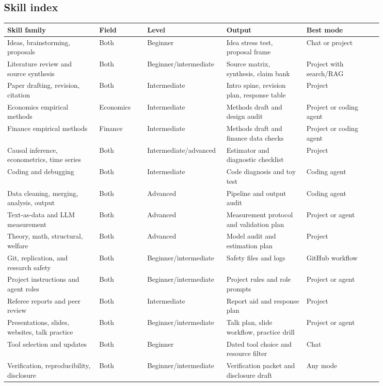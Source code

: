 \documentclass[11pt]{article}
\begin{document}
\subsection{Skill index}

\begin{longtable}{p{0.23\linewidth}p{0.12\linewidth}p{0.16\linewidth}p{0.20\linewidth}p{0.19\linewidth}}
\toprule
\textbf{Skill family} & \textbf{Field} & \textbf{Level} & \textbf{Output} & \textbf{Best mode}\\
\midrule
Ideas, brainstorming, proposals & Both & Beginner & Idea stress test, proposal frame & Chat or project\\
Literature review and source synthesis & Both & Beginner/intermediate & Source matrix, synthesis, claim bank & Project with search/RAG\\
Paper drafting, revision, citation & Both & Intermediate & Intro spine, revision plan, response table & Project\\
Economics empirical methods & Economics & Intermediate & Methods draft and design audit & Project or coding agent\\
Finance empirical methods & Finance & Intermediate & Methods draft and finance data checks & Project or coding agent\\
Causal inference, econometrics, time series & Both & Intermediate/advanced & Estimator and diagnostic checklist & Project\\
Coding and debugging & Both & Intermediate & Code diagnosis and toy test & Coding agent\\
Data cleaning, merging, analysis, output & Both & Advanced & Pipeline and output audit & Coding agent\\
Text-as-data and LLM measurement & Both & Advanced & Measurement protocol and validation plan & Project or agent\\
Theory, math, structural, welfare & Both & Advanced & Model audit and estimation plan & Project\\
Git, replication, and research safety & Both & Beginner/intermediate & Safety files and logs & GitHub workflow\\
Project instructions and agent roles & Both & Beginner/intermediate & Project rules and role prompts & Project or agent\\
Referee reports and peer review & Both & Intermediate & Report aid and response plan & Project\\
Presentations, slides, websites, talk practice & Both & Beginner/intermediate & Talk plan, slide workflow, practice drill & Project or agent\\
Tool selection and updates & Both & Beginner & Dated tool choice and resource filter & Chat\\
Verification, reproducibility, disclosure & Both & Beginner/intermediate & Verification packet and disclosure draft & Any mode\\
\bottomrule
\end{longtable}
\end{document}
